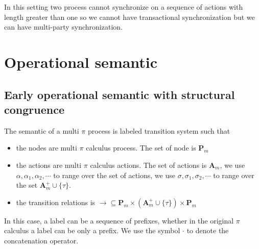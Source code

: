 In this setting two process cannot synchronize on a sequence of actions with length greater than one so we cannot have transactional synchronization but we can have multi-party synchronization.




\section{Operational semantic}

\subsection{Early operational semantic with structural congruence}

The semantic of a multi $\pi$ process is labeled transition system such that
\begin{itemize}
  \item 
    the nodes are multi $\pi$ calculus process. The set of node is $\mathbf{P}_{m}$
  \item
    the actions are multi $\pi$ calculus actions. The set of actions is $\mathbf{A}_{m}$, we use $\alpha, \alpha_{1}, \alpha_{2},\cdots $ to range over the set of actions, we use $\sigma, \sigma_{1}, \sigma_{2}, \cdots $ to range over the set $\mathbf{A}_{m}^{+} \cup \{\tau\}$.
  \item
    the transition relations is $\rightarrow\subseteq \mathbf{P}_{m}\times (\mathbf{A}_{m}^{+} \cup \{\tau\})\times \mathbf{P}_{m}$
\end{itemize}

In this case, a label can be a sequence of prefixes, whether in the original $\pi$ calculus a label can be only a prefix. We use the symbol $\cdot$ to denote the concatenation operator.

